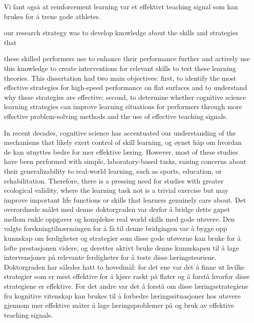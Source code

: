 Vi fant også at reinforcement learning var et effektivt teaching signal som kan brukes for å trene gode athletes. 















our research strategy was to develop knowledge about the skills and strategies that 


these skilled performers use to enhance their performance further and actively use this knowledge to create interventions for relevant skills to test these learning theories. This dissertation had two main objectives: first, to identify the most effective strategies for high-speed performance on flat surfaces and to understand why these strategies are effective; second, to determine whether cognitive science learning strategies can improve learning situations for performers through more effective problem-solving methods and the use of effective teaching signals. 






In recent decades, cognitive science has accentuated our understanding of the mechanisms that likely exert control of skill learning, og øynet håp om hvordan de kan utnyttes bedre for mer effektive læring. However, most of these studies have been performed with simple, laboratory-based tasks, raising concerns about their generalizability to real-world learning, such as sports, education, or rehabilitation. Therefore, there is a pressing need for studies with greater ecological validity, where the learning task not is a trivial exercise but may improve important life functions or skills that learners genuinely care about. Det overordnede målet med denne doktorgraden var derfor å bridge dette gapet mellom enkle oppgaver og komplekse real world skills med gode utøvere. Den valgte forskningtilnærmingen for å få til denne bridgingen var å bygge opp kunnskap om ferdigheter og strategier som disse gode utøverne kan bruke for å løfte prestasjonen videre, og deretter aktivt bruke denne kunnskapen til å lage intervensjoner på relevante ferdigheter for å teste disse læringsteoriene. Doktorgraden har således hatt to hovedmål: for det ene var det å finne ut hvilke strategier som er mest effektive for å kjøre raskt på flater og å forstå hvorfor disse strategiene er effektive. For det andre var det å forstå om disse læringsstrategiene fra kognitive vitenskap kan brukes til å forbedre læringssituasjoner hos utøvere gjennom mer effektive måter å lage læringsproblemer på og bruk av effektive teaching signals.

